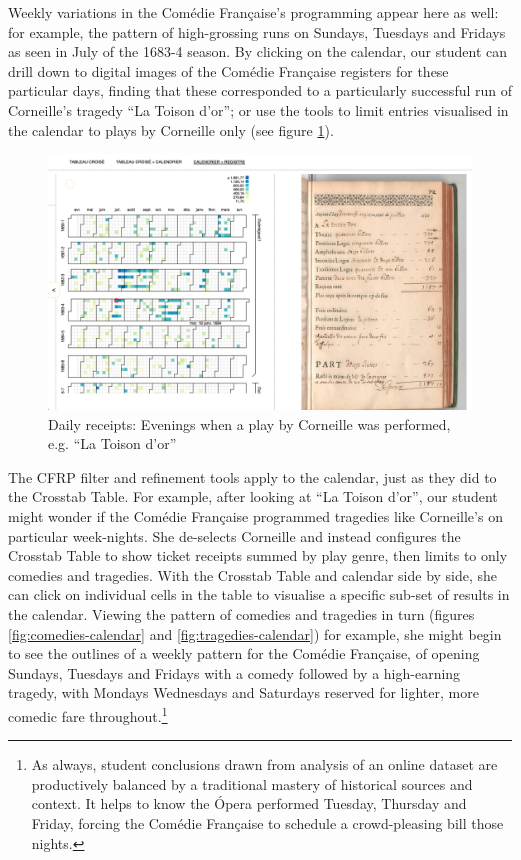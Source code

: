 \documentclass[	DIV=calc,%
							paper=a4,%
							fontsize=11pt,%
							twocolumn]{scrartcl}	 					%
\begin{document}
Weekly variations in the Comédie Française's programming appear here as well: for example, the pattern of high-grossing runs on Sundays, Tuesdays and Fridays as seen in July of the 1683-4 season.  By clicking on the calendar, our student can drill down to digital images of the Comédie Française registers for these particular days, finding that these corresponded to a particularly successful run of Corneille's tragedy ``La Toison d'or''; or use the tools to limit entries visualised in the calendar to plays by Corneille only (see figure \ref{fig:register-image-corneille}).

\begin{figure}
  \centering
	\includegraphics[width=7in]{steps/register-image-corneille.png}
	\caption{Daily receipts: Evenings when a play by Corneille was performed, e.g. ``La Toison d'or''}
	\label{fig:register-image-corneille}
\end{figure}

The CFRP filter and refinement tools apply to the calendar, just as they did to the Crosstab Table.  For example, after looking at ``La Toison d'or'', our student might wonder if the Comédie Française programmed tragedies like Corneille's on particular week-nights.  She de-selects Corneille and instead configures the Crosstab Table to show ticket receipts summed by play genre, then limits to only comedies and tragedies.  With the Crosstab Table and calendar side by side, she can click on individual cells in the table to visualise a specific sub-set of results in the calendar.  Viewing the pattern of comedies and tragedies in turn (figures \ref{fig:comedies-calendar} and \ref{fig:tragedies-calendar}) for example, she might begin to see the outlines of a weekly pattern for the Comédie Française, of opening Sundays, Tuesdays and Fridays with a comedy followed by a high-earning tragedy, with Mondays Wednesdays and Saturdays reserved for lighter, more comedic fare throughout.\footnote{As always, student conclusions drawn from analysis of an online dataset are productively balanced by a traditional mastery of historical sources and context.  It helps to know the Ópera performed Tuesday, Thursday and Friday, forcing the Comédie Française to schedule a crowd-pleasing bill those nights.}
\end{document}
